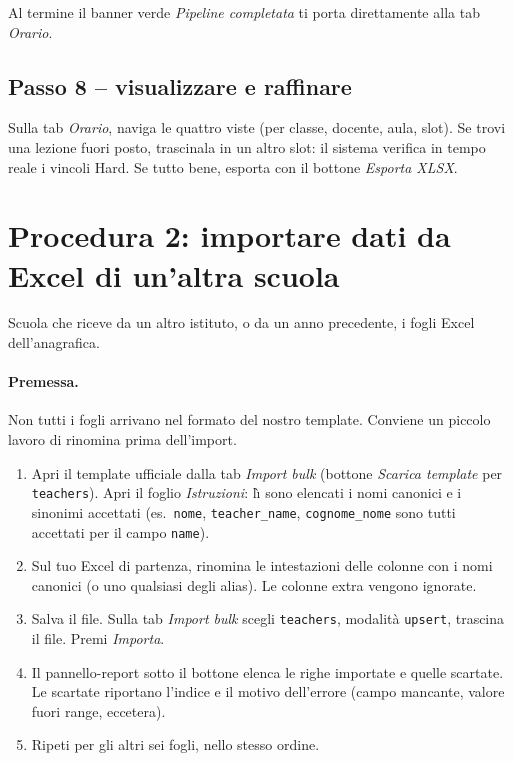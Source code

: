 Al termine il banner verde \emph{Pipeline completata} ti porta
direttamente alla tab \emph{Orario}.

\subsection{Passo 8 -- visualizzare e raffinare}

Sulla tab \emph{Orario}, naviga le quattro viste (per classe,
docente, aula, slot). Se trovi una lezione fuori posto, trascinala
in un altro slot: il sistema verifica in tempo reale i vincoli
Hard. Se tutto bene, esporta con il bottone \emph{Esporta XLSX}.


\section{Procedura 2: importare dati da Excel di un'altra scuola}
\label{sec:wf_import_excel}

Scuola che riceve da un altro istituto, o da un anno precedente,
i fogli Excel dell'anagrafica.

\paragraph{Premessa.} Non tutti i fogli arrivano nel formato del
nostro template. Conviene un piccolo lavoro di rinomina prima
dell'import.

\begin{enumerate}
\item Apri il template ufficiale dalla tab \emph{Import bulk}
  (bottone \emph{Scarica template} per \texttt{teachers}). Apri
  il foglio \emph{Istruzioni}: l\`{\i} sono elencati i nomi
  canonici e i sinonimi accettati (es.\ \texttt{nome},
  \texttt{teacher\_name}, \texttt{cognome\_nome} sono tutti
  accettati per il campo \texttt{name}).
\item Sul tuo Excel di partenza, rinomina le intestazioni
  delle colonne con i nomi canonici (o uno qualsiasi degli
  alias). Le colonne extra vengono ignorate.
\item Salva il file. Sulla tab \emph{Import bulk} scegli
  \texttt{teachers}, modalit\`a \texttt{upsert}, trascina il
  file. Premi \emph{Importa}.
\item Il pannello-report sotto il bottone elenca le righe
  importate e quelle scartate. Le scartate riportano l'indice
  e il motivo dell'errore (campo mancante, valore fuori
  range, eccetera).
\item Ripeti per gli altri sei fogli, nello stesso ordine.
\end{enumerate}

